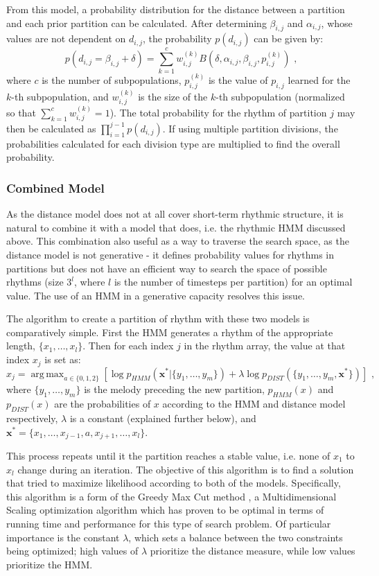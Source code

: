 \documentclass[ author={Stephen Livermore-Tozer},
				supervisor={Dr. Peter Flach},
				degree={MEng},
				title={Performing Algorithmic Co-composition Using Machine Learning},
				subtitle={},
				type={research},
				year={2016} ]{dissertation}
\DeclareMathOperator*{\argmax}{arg\,max}
\begin{document}
	From this model, a probability distribution for the distance between a partition and each prior partition can be calculated. After determining $\beta_{i,j}$ and $\alpha_{i,j}$, whose values are not dependent on $d_{i,j}$, the probability $p(d_{i,j})$ can be given by:
	$$p(d_{i,j} = \beta_{i,j} + \delta) = \sum_{k=1}^{c} w_{i,j}^{(k)} B(\delta,\alpha_{i,j},\beta_{i,j},p_{i,j}^{(k)}) \text{ ,}$$
	where $c$ is the number of subpopulations, $p_{i,j}^{(k)}$ is the value of $p_{i,j}$ learned for the $k$-th subpopulation, and $w_{i,j}^{(k)}$ is the size of the $k$-th subpopulation (normalized so that $\sum_{k=1}^{c} w_{i,j}^{(k)} = 1$). The total probability for the rhythm of partition $j$ may then be calculated as $\prod_{i=1}^{j-1} p(d_{i,j})$. If using multiple partition divisions, the probabilities calculated for each division type are multiplied to find the overall probability. 
	
	\subsubsection{Combined Model}
	
	As the distance model does not at all cover short-term rhythmic structure, it is natural to combine it with a model that does, i.e. the rhythmic HMM discussed above. This combination also useful as a way to traverse the search space, as the distance model is not generative - it defines probability values for rhythms in partitions but does not have an efficient way to search the space of possible rhythms (size $3^l$, where $l$ is the number of timesteps per partition) for an optimal value. The use of an HMM in a generative capacity resolves this issue.
	
	The algorithm to create a partition of rhythm with these two models is comparatively simple. First the HMM generates a rhythm of the appropriate length, $\{x_1,\dots,x_l\}$. Then for each index $j$ in the rhythm array, the value at that index $x_j$ is set as:
	$$ x_j = \argmax_{a \in \{0,1,2\}} \left[ \log p_{HMM}(\mathbf{x^*} | \{y_1,\dots,y_m\}) + \lambda \log p_{DIST}(\{y_1,\dots,y_m,\mathbf{x^*}\}) \right] \text{ ,}$$
	where $\{y_1,\dots,y_m\}$ is the melody preceding the new partition, $p_{HMM}(x)$ and $p_{DIST}(x)$ are the probabilities of $x$ according to the HMM and distance model respectively, $\lambda$ is a constant (explained further below), and $\mathbf{x^*} = \{x_1,\dots,x_{j-1},a,x_{j+1},\dots,x_l\}$.
	
	This process repeats until it the partition reaches a stable value, i.e. none of $x_1$ to $x_l$ change during an iteration. The objective of this algorithm is to find a solution that tried to maximize likelihood according to both of the models. Specifically, this algorithm is a form of the Greedy Max Cut method \cite{rohde2002methods}, a Multidimensional Scaling optimization algorithm which has proven to be optimal in terms of running time and performance for this type of search problem. Of particular importance is the constant $\lambda$, which sets a balance between the two constraints being optimized; high values of $\lambda$ prioritize the distance measure, while low values prioritize the HMM.
	
\end{document}
